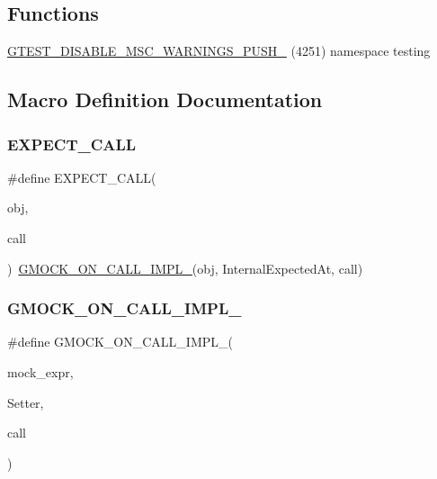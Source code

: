 \subsection*{Functions}
\begin{DoxyCompactItemize}
\item 
\mbox{\hyperlink{gmock-spec-builders_8h_a88f79832f9d045112a76e9da8611cc13}{G\+T\+E\+S\+T\+\_\+\+D\+I\+S\+A\+B\+L\+E\+\_\+\+M\+S\+C\+\_\+\+W\+A\+R\+N\+I\+N\+G\+S\+\_\+\+P\+U\+S\+H\+\_\+}} (4251) namespace testing
\end{DoxyCompactItemize}


\subsection{Macro Definition Documentation}
\mbox{\label{gmock-spec-builders_8h_a535a6156de72c1a2e25a127e38ee5232}} 
\subsubsection{\texorpdfstring{EXPECT\_CALL}{EXPECT\_CALL}}
{\footnotesize\ttfamily \#define E\+X\+P\+E\+C\+T\+\_\+\+C\+A\+LL(\begin{DoxyParamCaption}\item[{}]{obj,  }\item[{}]{call }\end{DoxyParamCaption})~\mbox{\hyperlink{gmock-spec-builders_8h_a2de39c343f6d2cc6d52c7786968ea7cf}{G\+M\+O\+C\+K\+\_\+\+O\+N\+\_\+\+C\+A\+L\+L\+\_\+\+I\+M\+P\+L\+\_\+}}(obj, Internal\+Expected\+At, call)}

\mbox{\label{gmock-spec-builders_8h_a2de39c343f6d2cc6d52c7786968ea7cf}} 
\subsubsection{\texorpdfstring{GMOCK\_ON\_CALL\_IMPL\_}{GMOCK\_ON\_CALL\_IMPL\_}}
{\footnotesize\ttfamily \#define G\+M\+O\+C\+K\+\_\+\+O\+N\+\_\+\+C\+A\+L\+L\+\_\+\+I\+M\+P\+L\+\_\+(\begin{DoxyParamCaption}\item[{}]{mock\+\_\+expr,  }\item[{}]{Setter,  }\item[{}]{call }\end{DoxyParamCaption})}

